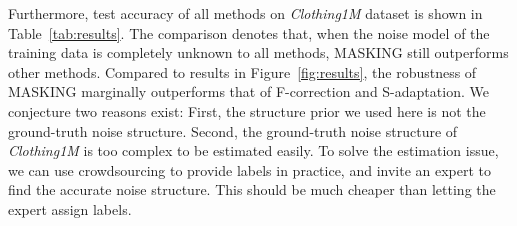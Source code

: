 \documentclass{article}
\begin{document}
\begin{table}[ht]
\centering
{}
\caption{The estimation of the noise transition matrix by F-correction (1st row), S-adaptation (2nd row) and MASKING (3rd row), and the truth (4th row) in the case of three types of noise transition structure: column-diagonal (1st column), tri-diagonal (2nd column), block-diagonal (3rd column).}
\label{tab:results-2}
\end{table}





\vspace{-5px}
Furthermore, test accuracy of all methods on \emph{Clothing1M} dataset is shown in Table~\ref{tab:results}. The comparison denotes that, when the noise model of the training data is completely unknown to all methods, MASKING still outperforms other methods. Compared to results in Figure~\ref{fig:results}, the robustness of MASKING marginally outperforms that of F-correction and S-adaptation. We conjecture two reasons exist: First, the structure prior we used here is not the ground-truth noise structure. Second, the ground-truth noise structure of \textit{Clothing1M} is too complex to be estimated easily. To solve the estimation issue, we can use crowdsourcing to provide labels in practice, and invite an expert to find the accurate noise structure. This should be much cheaper than letting the expert assign labels.
\vspace{-5px}
\end{document}
